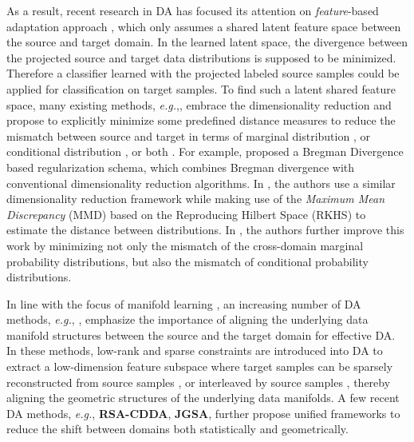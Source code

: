 \documentclass[journal,twocolumn]{IEEEtran}
\begin{document}
\begin{CJK*}{UTF8}{gkai}
As a result, recent research in DA has focused its attention on \textit{feature}-based adaptation approach \cite{long2013transfer,Zhang_2017_CVPR,DBLP:journals/ijcv/ShaoKF14,DBLP:conf/cvpr/LongWDSY14,DBLP:journals/tip/XuFWLZ16,DBLP:journals/corr/LuoWHWTC17}, which only assumes a shared latent feature space between the source and target domain. In the learned latent space, the divergence between the projected source and target data distributions is supposed to be minimized. Therefore a classifier learned with the projected labeled source samples could be applied for classification on target samples. To find such a latent shared feature space, many existing methods, \textit{e.g.},\cite{pan2011domain,long2013transfer,Zhang_2017_CVPR,DBLP:conf/cvpr/LongWDSY14,JMLR:v17:15-207}, embrace the dimensionality reduction and propose to explicitly minimize some predefined distance measures to reduce the mismatch between source and target in terms of marginal distribution \cite{4967588} \cite{pan2008transfer} \cite{pan2011domain}, or conditional distribution \cite{satpal2007domain}, or both \cite{long2013transfer}. For example, \cite{4967588} proposed a Bregman Divergence based regularization schema, which combines Bregman divergence with conventional dimensionality reduction algorithms. In \cite{pan2011domain}, the authors use a similar dimensionality reduction framework while making use of the \textit{Maximum Mean Discrepancy} (MMD) based on the Reproducing Hilbert Space (RKHS) \cite{borgwardt2006integrating} to estimate the distance between distributions. In \cite{long2013transfer}, the authors further improve this work by minimizing not only the mismatch of the cross-domain marginal probability distributions, but also  the mismatch of conditional probability distributions. 

In line with the focus of manifold learning \cite{Zhou04learningwith}, an increasing number of DA methods, \textit{e.g.}, \cite{DBLP:journals/corr/LuoWHC17,DBLP:journals/ijcv/ShaoKF14,DBLP:journals/tip/XuFWLZ16},  emphasize the importance of aligning the underlying data manifold structures between the source and the target domain for effective DA. In these methods, low-rank and sparse constraints are introduced into DA to extract a low-dimension feature subspace where target samples can be sparsely reconstructed from source samples \cite{DBLP:journals/ijcv/ShaoKF14}, or interleaved by source samples \cite{DBLP:journals/tip/XuFWLZ16},  thereby aligning the geometric structures of the underlying data manifolds. A few recent DA methods, \textit{e.g.}, \textbf{RSA-CDDA}\cite{DBLP:journals/corr/LuoWHC17}, \textbf{JGSA}\cite{Zhang_2017_CVPR}, further propose unified frameworks to reduce the shift between domains both statistically and geometrically.  


\end{CJK*}
\end{document}
